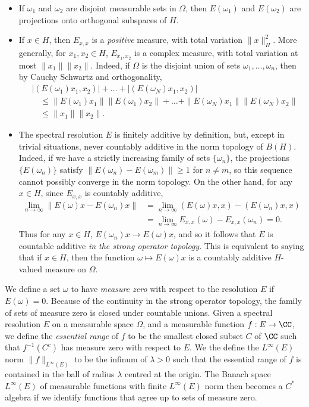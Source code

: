 \begin{itemize}
    \item If $\omega_1$ and $\omega_2$ are disjoint measurable sets in $\Omega$, then $E(\omega_1)$ and $E(\omega_2)$ are projections onto orthogonal subspaces of $H$.

    \item If $x \in H$, then $E_{x,x}$ is a \emph{positive} measure, with total variation $\| x \|_H^2$. More generally, for $x_1,x_2 \in H$, $E_{x_1,x_2}$ is a complex measure, with total variation at most $\| x_1 \| \| x_2 \|$. Indeed, if $\Omega$ is the disjoint union of sets $\omega_1,\dots,\omega_n$, then by Cauchy Schwartz and orthogonality,
    \begin{align*}
        &|(E(\omega_1) x_1, x_2)| + \dots + |(E(\omega_N) x_1, x_2)|\\
        &\quad\leq \| E(\omega_1) x_1 \| \| E(\omega_1) x_2 \| + \dots + \| E(\omega_N) x_1 \| \| E(\omega_N) x_2 \| \\
            &\quad\leq \| x_1 \| \| x_2 \|.
    \end{align*}

    \item The spectral resolution $E$ is finitely additive by definition, but, except in trivial situations, never countably additive in the norm topology of $B(H)$. Indeed, if we have a strictly increasing family of sets $\{ \omega_n \}$, the projections $\{ E(\omega_n) \}$ satisfy $\| E(\omega_n) - E(\omega_m) \| \geq 1$ for $n \neq m$, so this sequence cannot possibly converge in the norm topology. On the other hand, for any $x \in H$, since $E_{x,x}$ is countably additive,
    \begin{align*}
        \lim_{n \to \infty} \| E(\omega) x - E(\omega_n) x \| &= \lim_{n \to \infty} (E(\omega) x, x) - (E(\omega_n) x, x)\\
        &= \lim_{n \to \infty} E_{x,x}(\omega) - E_{x,x}(\omega_n) = 0.
    \end{align*}
    Thus for any $x \in H$, $E(\omega_n) x \to E(\omega) x$, and so it follows that $E$ is countable additive \emph{in the strong operator topology}. This is equivalent to saying that if $x \in H$, then the function $\omega \mapsto E(\omega) x$ is a countably additive $H$-valued measure on $\Omega$.
\end{itemize}

We define a set $\omega$ to have \emph{measure zero} with respect to the resolution $E$ if $E(\omega) = 0$. Because of the continuity in the strong operator topology, the family of sets of measure zero is closed under countable unions. Given a spectral resolution $E$ on a measurable space $\Omega$, and a measurable function $f: E \to \CC$, we define the \emph{essential range} of $f$ to be the smallest closed subset $C$ of $\CC$ such that $f^{-1}(C^c)$ has measure zero with respect to $E$. We the define the $L^\infty(E)$ norm $\| f \|_{L^\infty(E)}$ to be the infinum of $\lambda > 0$ such that the essential range of $f$ is contained in the ball of radius $\lambda$ centred at the origin. The Banach space $L^\infty(E)$ of measurable functions with finite $L^\infty(E)$ norm then becomes a $C^*$ algebra if we identify functions that agree up to sets of measure zero.

